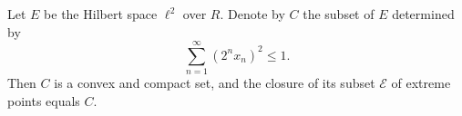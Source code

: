 Let $E$ be the Hilbert space $\ell^2$ over $R$. Denote by $C$ the subset of $E$ determined by
$$\sum_{n=1}^{\infty} (2^n x_n)^2 \leq 1.$$
Then $C$ is a convex and compact set, and the closure of its subset $\mathcal{E}$ of extreme points equals $C$.

